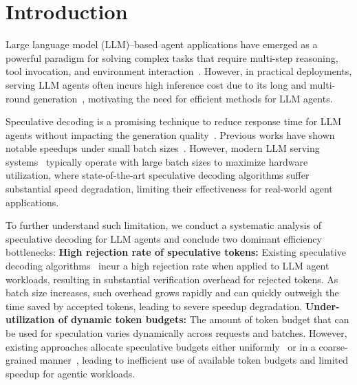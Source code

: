 \section{Introduction}
\label{sec:introduction}
Large language model (LLM)–based agent applications have emerged as a powerful paradigm for solving complex tasks that require multi-step reasoning, tool invocation, and environment interaction~\citep{DBLP:conf/coling/Li25,DBLP:journals/corr/abs-2503-21460}. However, in practical deployments, serving LLM agents often incurs high inference cost due to its long and multi-round generation~\citep{DBLP:journals/tmlr/Wan0LA0LQYZZC024,wang2024iot,DBLP:journals/corr/abs-2502-13965, DBLP:journals/corr/abs-2508-02694}, motivating the need for efficient methods for LLM agents.

Speculative decoding is a promising technique to reduce response time for LLM agents without impacting the generation quality~\citep{DBLP:conf/acl/XiaYDW00L0S24}. Previous works have shown notable speedups under small batch sizes~\citep{DBLP:journals/corr/abs-2503-01840, saxena2023prompt, oliaro2025suffixdecoding, DBLP:journals/corr/abs-2305-09781, 10.1145/3772052.3772239}. However, modern LLM serving systems~\citep{DBLP:conf/sosp/KwonLZ0ZY0ZS23, DBLP:conf/nips/ZhengYXS0YCKSGB24} typically operate with large batch sizes to maximize hardware utilization, where state-of-the-art speculative decoding algorithms suffer substantial speed degradation, limiting their effectiveness for real-world agent applications.

To further understand such limitation, we conduct a systematic analysis of speculative decoding for LLM agents and conclude two dominant efficiency bottlenecks: 
%
 \textbf{High rejection rate of speculative tokens:} Existing speculative decoding algorithms~\citep{DBLP:journals/corr/abs-2503-01840, saxena2023prompt, oliaro2025suffixdecoding} incur a high rejection rate when applied to LLM agent workloads, resulting in substantial verification overhead for rejected tokens. As batch size increases, such overhead grows rapidly and can quickly outweigh the time saved by accepted tokens, leading to severe speedup degradation.
%
 \textbf{Under-utilization of dynamic token budgets:} The amount of token budget that can be used for speculation varies dynamically across requests and batches. However, existing approaches allocate speculative budgets either uniformly~\citep{DBLP:journals/corr/abs-2305-09781, DBLP:conf/acl/WuZVPRL25, DBLP:conf/iclr/SadhukhanCCTLSY25} or in a coarse-grained manner~\citep{10.1145/3772052.3772239}, leading to inefficient use of available token budgets and limited speedup for agentic workloads.

